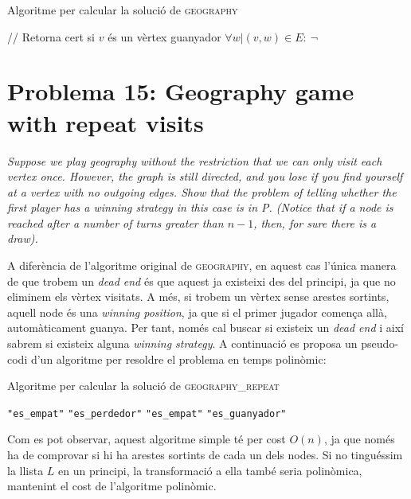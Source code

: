 \documentclass[a4paper]{article}
\begin{document}
\begin{algorithm}[H]
	\caption{Algoritme per calcular la solució de \textsc{geography}}
	\begin{algorithmic}[1]
		\State // Retorna cert si $v$ és un vèrtex guanyador
			\State \Return $\forall w | (v,w) \in E : \ \neg$ 
		\EndFunction
	\end{algorithmic}
\end{algorithm}

\pagebreak
\section{Problema 15: Geography game with repeat visits}
\emph{Suppose we play geography without the restriction that we can only visit each vertex once. However, the graph is still directed, and you lose if you find yourself at a vertex with no outgoing edges. Show that the problem of telling whether the first player has a winning strategy in this case is in P. (Notice that if a node is reached after a number of turns greater than $n − 1$, then, for sure there is a draw).}

A diferència de l’algoritme original de \textsc{geography}, en aquest cas l'única manera de que trobem un \emph{dead end} és que aquest ja existeixi des del principi, ja que no eliminem els vèrtex visitats. A més, si  trobem un vèrtex sense arestes sortints, aquell node és una \emph{winning position}, ja que si el primer jugador comença allà, automàticament guanya. Per tant, només cal buscar si existeix un \emph{dead end} i així sabrem si existeix alguna \emph{winning strategy}. A continuació es proposa un pseudo-codi d'un algoritme per resoldre el problema en temps polinòmic:

\begin{algorithm}[H]
	\caption{Algoritme per calcular la solució de \textsc{geography\_repeat}}
	\begin{algorithmic}[1]
				\State \Return \texttt{"es\_empat"}
				\State \Return \texttt{"es\_perdedor"}
				\State \Return \texttt{"es\_empat"}
			\Else
				\State \Return \texttt{"es\_guanyador"}
			\EndIf
		\EndFunction
	\end{algorithmic}
\end{algorithm}

Com es pot observar, aquest algoritme simple té per cost $O(n)$, ja que només ha de comprovar si hi ha arestes sortints de cada un dels nodes. Si no tinguéssim la llista $L$ en un principi, la transformació a ella també seria polinòmica, mantenint el cost de l’algoritme polinòmic.
\end{document}
